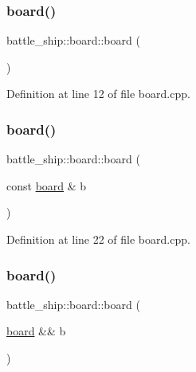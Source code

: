 \subsubsection{\texorpdfstring{board()}{board()}\hspace{0.1cm}{\footnotesize\ttfamily [1/3]}}
{\footnotesize\ttfamily battle\+\_\+ship\+::board\+::board (\begin{DoxyParamCaption}{ }\end{DoxyParamCaption})}



Definition at line 12 of file board.\+cpp.

\mbox{\label{classbattle__ship_1_1board_a72bdef4b84b4c2d8241b4307cae2cb9e}} 
\subsubsection{\texorpdfstring{board()}{board()}\hspace{0.1cm}{\footnotesize\ttfamily [2/3]}}
{\footnotesize\ttfamily battle\+\_\+ship\+::board\+::board (\begin{DoxyParamCaption}\item[{const \hyperlink{classbattle__ship_1_1board}{board} \&}]{b }\end{DoxyParamCaption})}



Definition at line 22 of file board.\+cpp.

\mbox{\label{classbattle__ship_1_1board_aae7ac9e7bbd44c1b2d7a745721936ee2}} 
\subsubsection{\texorpdfstring{board()}{board()}\hspace{0.1cm}{\footnotesize\ttfamily [3/3]}}
{\footnotesize\ttfamily battle\+\_\+ship\+::board\+::board (\begin{DoxyParamCaption}\item[{\hyperlink{classbattle__ship_1_1board}{board} \&\&}]{b }\end{DoxyParamCaption})}



